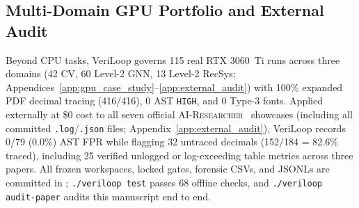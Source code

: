\subsection{Multi-Domain GPU Portfolio and External Audit}
\label{sec:dogfood}

Beyond CPU tasks, VeriLoop governs 115 real RTX 3060~Ti runs across three domains (42 CV, 60 Level-2 GNN, 13 Level-2 RecSys; Appendices~\ref{app:gpu_case_study}--\ref{app:external_audit}) with 100\% expanded PDF decimal tracing (416/416), 0 AST \texttt{HIGH}, and 0 Type-3 fonts.
Applied externally at \$0 cost to all seven official \textsc{AI-Researcher}~\citep{tang2025airesearcher} showcases (including all committed \texttt{.log}/\texttt{.json} files; Appendix~\ref{app:external_audit}), VeriLoop records 0/79 (0.0\%) AST FPR while flagging 32 untraced decimals (152/184 = 82.6\% traced), including 25 verified unlogged or log-exceeding table metrics across three papers.
All frozen workspaces, locked gates, forensic CSVs, and JSONLs are committed in \RepoRef; \texttt{./veriloop test} passes 68 offline checks, and \texttt{./veriloop audit-paper} audits this manuscript end to end.
